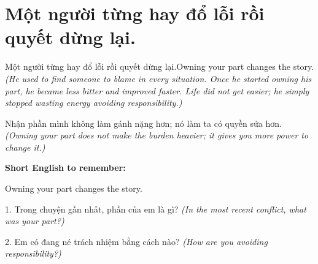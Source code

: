 \section{Một người từng hay đổ lỗi rồi quyết dừng lại.}
\begin{truyen}{Một người từng hay đổ lỗi rồi quyết dừng lại.}{Owning your part changes the story.}
\textit{(He used to find someone to blame in every situation. Once he started owning his part, he became less bitter and improved faster. Life did not get easier; he simply stopped wasting energy avoiding responsibility.)}
\end{truyen}
\begin{baihoc}
Nhận phần mình không làm gánh nặng hơn; nó làm ta có quyền sửa hơn.
\textit{(Owning your part does not make the burden heavier; it gives you more power to change it.)}
\end{baihoc}
\begin{ghinhoanh}\textbf{Short English to remember:}

Owning your part changes the story.
\end{ghinhoanh}
\begin{tuhocnhanh}
1. Trong chuyện gần nhất, phần của em là gì? \textit{(In the most recent conflict, what was your part?)}

2. Em có đang né trách nhiệm bằng cách nào? \textit{(How are you avoiding responsibility?)}
\end{tuhocnhanh}
\ngancach

